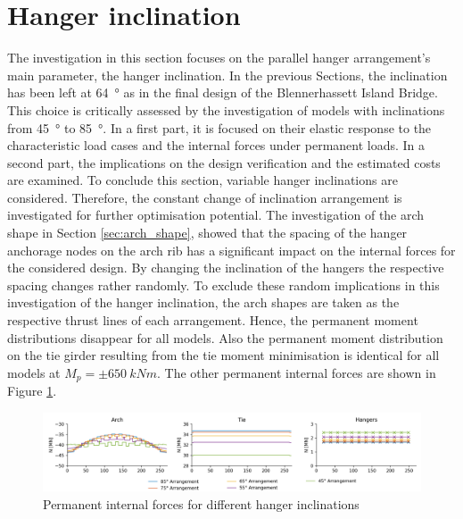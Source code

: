 \section{Hanger inclination}
The investigation in this section focuses on the parallel hanger arrangement's main parameter, the hanger inclination. In the previous Sections, the inclination has been left at \SI{64}{\degree} as in the final design of the Blennerhassett Island Bridge. This choice is critically assessed by the investigation of models with inclinations from \SI{45}{\degree} to \SI{85}{\degree}. In a first part, it is focused on their elastic response to the characteristic load cases and the internal forces under permanent loads.  In a second part, the implications on the design verification and the estimated costs are examined. To conclude this section, variable hanger inclinations are considered. Therefore, the constant change of inclination arrangement is investigated for further optimisation potential.  
The investigation of the arch shape in Section \ref{sec:arch_shape}, showed that the spacing of the hanger anchorage nodes on the arch rib has a significant impact on the internal forces for the considered design. By changing the inclination of the hangers the respective spacing changes rather randomly. To exclude these random implications in this investigation of the hanger inclination, the arch shapes are taken as the respective thrust lines of each arrangement. Hence, the permanent moment distributions disappear for all models. Also the permanent moment distribution on the tie girder resulting from the tie moment minimisation is identical for all models at $M_p=\pm \SI{650}{kNm}$. The other permanent internal forces are shown in Figure \ref{fig:inclination_permanent}.

\begin{figure}[H]
    \centering
    \includegraphics[trim={1cm 0 13cm 0},clip, width=\textwidth]{calculations/parallel arrangement comparison/permanent_plot.png}
    \caption{Permanent internal forces for different hanger inclinations}
    \label{fig:inclination_permanent}
\end{figure}

